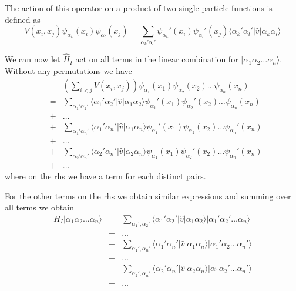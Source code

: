 \documentclass[graybox,sectrefs,envcountresetchap,open=right]{svmonodo}
\begin{document}
The action of this operator on a product of 
two single-particle functions is defined as 
\begin{equation}
	V(x_i,x_j) \psi_{\alpha_k}(x_i) \psi_{\alpha_l}(x_j) = \sum_{\alpha_k'\alpha_l'} 
		\psi_{\alpha_k}'(x_i)\psi_{\alpha_l}'(x_j) 
		\langle \alpha_k'\alpha_l'|\hat{v}|\alpha_k\alpha_l\rangle \label{eq:2-32}
\end{equation}



We can now let $\hat{H}_I$ act on all terms in the linear combination for $|\alpha_1\alpha_2\dots\alpha_n\rangle$. Without any permutations we have
\begin{eqnarray}
	&& \left( \sum_{i < j} V(x_i,x_j) \right) \psi_{\alpha_1}(x_1)\psi_{\alpha_2}(x_2)\dots \psi_{\alpha_n}(x_n) \nonumber \\
	&=& \sum_{\alpha_1'\alpha_2'} \langle \alpha_1'\alpha_2'|\hat{v}|\alpha_1\alpha_2\rangle
		\psi_{\alpha_1}'(x_1)\psi_{\alpha_2}'(x_2)\dots \psi_{\alpha_n}(x_n) \nonumber \\
	& +& \dots \nonumber \\
	&+& \sum_{\alpha_1'\alpha_n'} \langle \alpha_1'\alpha_n'|\hat{v}|\alpha_1\alpha_n\rangle
		\psi_{\alpha_1}'(x_1)\psi_{\alpha_2}(x_2)\dots \psi_{\alpha_n}'(x_n) \nonumber \\
	& +& \dots \nonumber \\
	&+& \sum_{\alpha_2'\alpha_n'} \langle \alpha_2'\alpha_n'|\hat{v}|\alpha_2\alpha_n\rangle
		\psi_{\alpha_1}(x_1)\psi_{\alpha_2}'(x_2)\dots \psi_{\alpha_n}'(x_n) \nonumber \\
	 & +& \dots \label{eq:2-33}
\end{eqnarray}
where on the rhs we have a term for each distinct pairs. 




For the other terms on the rhs we obtain similar expressions  and summing over all terms we obtain
\begin{eqnarray}
	H_I |\alpha_1\alpha_2\dots\alpha_n\rangle &=& \sum_{\alpha_1', \alpha_2'} \langle \alpha_1'\alpha_2'|\hat{v}|\alpha_1\alpha_2\rangle
		|\alpha_1'\alpha_2'\dots\alpha_n\rangle \nonumber \\
	&+& \dots \nonumber \\
	&+& \sum_{\alpha_1', \alpha_n'} \langle \alpha_1'\alpha_n'|\hat{v}|\alpha_1\alpha_n\rangle
		|\alpha_1'\alpha_2\dots\alpha_n'\rangle \nonumber \\
	&+& \dots \nonumber \\
	&+& \sum_{\alpha_2', \alpha_n'} \langle \alpha_2'\alpha_n'|\hat{v}|\alpha_2\alpha_n\rangle
		|\alpha_1\alpha_2'\dots\alpha_n'\rangle \nonumber \\
	 &+& \dots \label{eq:2-34}
\end{eqnarray}
\end{document}
